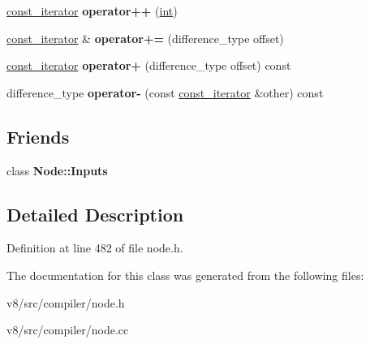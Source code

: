\begin{DoxyCompactItemize}
\mbox{\hyperlink{classv8_1_1internal_1_1compiler_1_1Node_1_1Inputs_1_1const__iterator}{const\+\_\+iterator}} {\bfseries operator++} (\mbox{\hyperlink{classint}{int}})
\item 
\mbox{\label{classv8_1_1internal_1_1compiler_1_1Node_1_1Inputs_1_1const__iterator_aef01d323d0aa65702bd72b7fd513cc0d}} 
\mbox{\hyperlink{classv8_1_1internal_1_1compiler_1_1Node_1_1Inputs_1_1const__iterator}{const\+\_\+iterator}} \& {\bfseries operator+=} (difference\+\_\+type offset)
\item 
\mbox{\label{classv8_1_1internal_1_1compiler_1_1Node_1_1Inputs_1_1const__iterator_a6fbfef1f0a53d085e219219981a0062d}} 
\mbox{\hyperlink{classv8_1_1internal_1_1compiler_1_1Node_1_1Inputs_1_1const__iterator}{const\+\_\+iterator}} {\bfseries operator+} (difference\+\_\+type offset) const
\item 
\mbox{\label{classv8_1_1internal_1_1compiler_1_1Node_1_1Inputs_1_1const__iterator_a86df56f38862f377fc6358cbb585f63e}} 
difference\+\_\+type {\bfseries operator-\/} (const \mbox{\hyperlink{classv8_1_1internal_1_1compiler_1_1Node_1_1Inputs_1_1const__iterator}{const\+\_\+iterator}} \&other) const
\end{DoxyCompactItemize}
\subsection*{Friends}
\begin{DoxyCompactItemize}
\item 
\mbox{\label{classv8_1_1internal_1_1compiler_1_1Node_1_1Inputs_1_1const__iterator_ab5632873536c3e0c97344fa0dc6184da}} 
class {\bfseries Node\+::\+Inputs}
\end{DoxyCompactItemize}


\subsection{Detailed Description}


Definition at line 482 of file node.\+h.



The documentation for this class was generated from the following files\+:\begin{DoxyCompactItemize}
\item 
v8/src/compiler/node.\+h\item 
v8/src/compiler/node.\+cc\end{DoxyCompactItemize}

